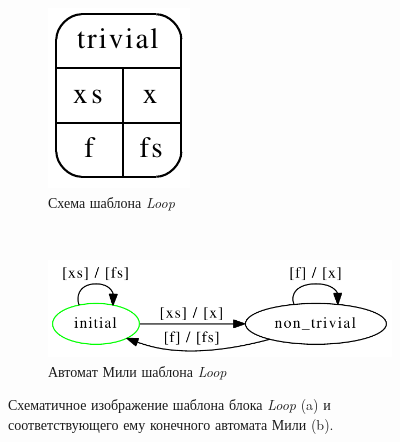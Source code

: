 \documentclass[10pt,a4paper]{article}
\begin{document}
\begin{figure}[H]
  \centering

  \begin{subfigure}[b]{0.2\textwidth}
    \centering
    \label{map:connection}
    \includegraphics[width=\textwidth]{map_cg.pdf}
    \caption{Схема шаблона \textit{Loop}}
  \end{subfigure}
  ~
  \begin{subfigure}[b]{0.7\textwidth}
    \centering
    \label{map:fa}
    \includegraphics[width=\textwidth]{map_fa.pdf}
    \caption{Автомат Мили шаблона \textit{Loop}}
  \end{subfigure}
  
  \label{map}
  \caption{Схематичное изображение шаблона блока \textit{Loop} (a) и соответствующего ему конечного автомата Мили (b).}
\end{figure}
\end{document}
